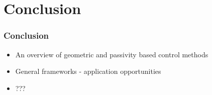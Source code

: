 \section{Conclusion}

\begin{frame}
	\frametitle{Conclusion}
	
	\begin{itemize}
		\item An overview of geometric and passivity based control methods
		\item General frameworks - application opportunities
		\item ???
	\end{itemize}
\end{frame}

\begin{frame}
	
\end{frame}

